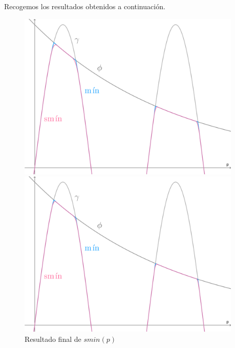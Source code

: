 Recogemos los resultados obtenidos a continuación.
\begin{figure}[!h]
     \begin{minipage}[c]{0.49\linewidth}
        \centering
        \includegraphics[width=0.95\textwidth]{Plantilla-TFG-master/img/smin_3.png}
        \caption{$k=0.1,\ n=2$}
     \end{minipage}
     \begin{minipage}[c]{0.49\linewidth}
        \centering
        \includegraphics[width=0.95\textwidth]{Plantilla-TFG-master/img/smin_4.png}
        \caption{$k=0.1,\ n=3$}
     \end{minipage}
     \caption{Resultado final de $smin(p)$ }
     \label{fig:smooth2}
\end{figure}





